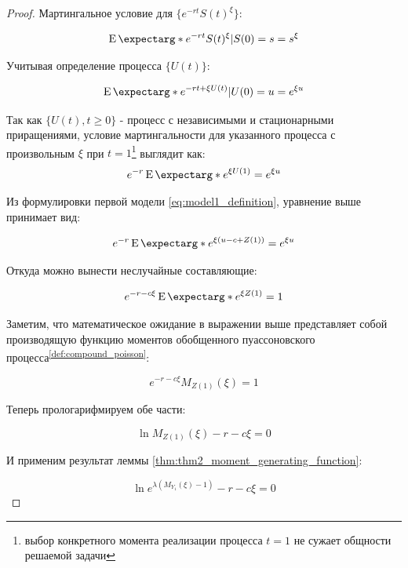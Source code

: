 \documentclass[a4paper,12pt]{article}
\theoremstyle{definition}
\newcommand{\expect}{\operatorname{E}\expectarg}
\begin{document}
\begin{proof}
Мартингальное условие для $\{e^{-rt} S(t)^{\xi}\}$:

\begin{equation*}
\expect*{e^{-rt} S(t)^{\xi}|S(0) = s} = s^{\xi}
\end{equation*}

Учитывая определение процесса $\{U(t)\}$:

\begin{equation*}
\expect*{e^{-rt + \xi U(t)}|U(0) = u} = e^{\xi u}
\end{equation*}

Так как $\{U(t), t \ge 0\}$ - процесс с независимыми и стационарными приращениями, условие мартингальности для указанного процесса с произвольным $\xi$ при $t = 1$\footnote{выбор конкретного момента реализации процесса $t=1$ не сужает общности решаемой задачи} выглядит как:
\begin{equation*}\label{eq:thm2_eq1}
e^{-r}\expect*{e^{\xi U(1)}} = e^{\xi u}
\end{equation*}

Из формулировки первой модели \eqref{eq:model1_definition}, уравнение выше принимает вид:

\begin{equation*}
e^{-r}\expect*{e^{\xi(u - c + Z(1))}} = e^{\xi u}
\end{equation*}

Откуда можно вынести неслучайные составляющие:

\begin{equation*}
e^{-r - c \xi} \expect*{e^{\xi Z(1)}} = 1
\end{equation*}

Заметим, что математическое ожидание в выражении выше представляет собой производящую функцию моментов обобщенного пуассоновского процесса\textsuperscript{{\ref{def:compound_poisson}}}:

\begin{equation*}
e^{-r - c \xi} M_{Z(1)}(\xi) = 1
\end{equation*}

Теперь прологарифмируем обе части:

\begin{equation*}
\ln{M_{Z(1)}(\xi)} - r - c\xi = 0
\end{equation*}

И применим результат леммы \ref{thm:thm2_moment_generating_function}:

\begin{equation*}
\ln{e^{\lambda (M_{Y_1}(\xi) - 1)}} - r - c\xi = 0
\end{equation*}


\end{proof}
\end{document}
